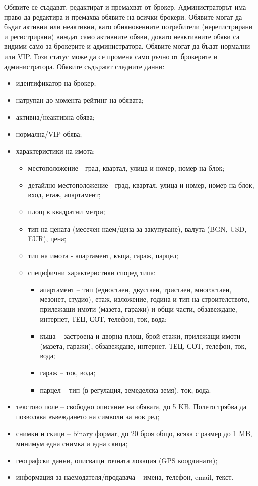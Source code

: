 \documentclass[]{article}
\begin{document}
\begin{enumerate}[I.]
{Обявите се създават, редактират и премахват от брокер. Администраторът има право да редактира и премахва обявите на всички брокери.	Обявите могат да бъдат активни или неактивни, като обикновенните потребители (нерегистрирани и регистрирани) виждат само активните обяви, докато неактивните обяви са видими само за брокерите и администратора.
Обявите могат да бъдат нормални или VIP. Този статус може да се променя само ръчно от брокерите и администратора.
Обявите съдържат следните данни:
	\begin{itemize}
	\item идентификатор на брокер;
	\item натрупан до момента рейтинг на обявата;
	\item активна/неактивна обява; 
	\item нормална/VIP обява;
	\item {характеристики на имота:
		\begin{itemize}
		\item местоположение - град, квартал, улица и номер, номер на блок;
		\item детайлно местоположение - град, квартал, улица и номер, номер на блок, вход, етаж, апартамент;
		\item площ в квадратни метри;
		\item тип на цената (месечен наем/цена за закупуване), валута (BGN, USD, EUR), цена;
		\item тип на имота - апартамент, къща, гараж, парцел;
		\item {специфични характеристики според типа:
			\begin{itemize}
			\item апартамент -- тип (едностаен, двустаен, тристаен, многостаен, мезонет, студио), етаж, изложение, година и тип на строителството, прилежащи имоти (мазета, гаражи) и общи части, обзавеждане, интернет, ТЕЦ, СОТ, телефон, ток, вода;
			\item къща -- застроена и дворна площ, брой етажи, прилежащи имоти (мазета, гаражи),	обзавеждане, интернет, ТЕЦ, СОТ, телефон, ток, вода;
			\item гараж -- ток, вода;
			\item парцел -- тип (в регулация, земеделска земя), ток, вода.
			\end{itemize}
		}
		\end{itemize}
	}
	\item текстово поле -- свободно описание на обявата, до 5 KB. Полето трябва да позволява въвеждането на символи за нов ред;
	\item снимки и скици -- binary формат, до 20 броя общо, всяка с размер до 1 MB, минимум една снимка и една скица; 
	\item географски данни, описващи точната локация (GPS координати);
	\item информация за наемодателя/продавача -- имена, телефон, email, текст.
	\end{itemize}
	
}
\end{enumerate}
\end{document}
